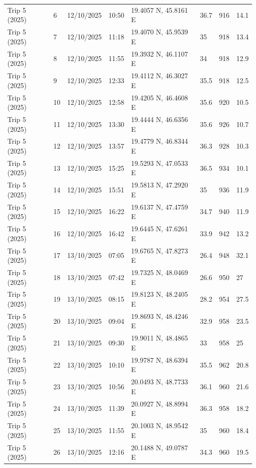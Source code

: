 \begin{scriptsize}
\begin{longtable}{llllllll}
Trip 5 (2025) & 6 & 12/10/2025 & 10:50 & 19.4057 N, 45.8161 E & 36.7 & 916 & 14.1 \\
Trip 5 (2025) & 7 & 12/10/2025 & 11:18 & 19.4070 N, 45.9539 E & 35 & 918 & 13.4 \\
Trip 5 (2025) & 8 & 12/10/2025 & 11:55 & 19.3932 N, 46.1107 E & 34 & 918 & 12.9 \\
Trip 5 (2025) & 9 & 12/10/2025 & 12:33 & 19.4112 N, 46.3027 E & 35.5 & 918 & 12.5 \\
Trip 5 (2025) & 10 & 12/10/2025 & 12:58 & 19.4205 N, 46.4608 E & 35.6 & 920 & 10.5 \\
Trip 5 (2025) & 11 & 12/10/2025 & 13:30 & 19.4444 N, 46.6356 E & 35.6 & 926 & 10.7 \\
Trip 5 (2025) & 12 & 12/10/2025 & 13:57 & 19.4779 N, 46.8344 E & 36.3 & 928 & 10.3 \\
Trip 5 (2025) & 13 & 12/10/2025 & 15:25 & 19.5293 N, 47.0533 E & 36.5 & 934 & 10.1 \\
Trip 5 (2025) & 14 & 12/10/2025 & 15:51 & 19.5813 N, 47.2920 E & 35 & 936 & 11.9 \\
Trip 5 (2025) & 15 & 12/10/2025 & 16:22 & 19.6137 N, 47.4759 E & 34.7 & 940 & 11.9 \\
Trip 5 (2025) & 16 & 12/10/2025 & 16:42 & 19.6445 N, 47.6261 E & 33.9 & 942 & 13.2 \\
Trip 5 (2025) & 17 & 13/10/2025 & 07:05 & 19.6765 N, 47.8273 E & 26.4 & 948 & 32.1 \\
Trip 5 (2025) & 18 & 13/10/2025 & 07:42 & 19.7325 N, 48.0469 E & 26.6 & 950 & 27 \\
Trip 5 (2025) & 19 & 13/10/2025 & 08:15 & 19.8123 N, 48.2405 E & 28.2 & 954 & 27.5 \\
Trip 5 (2025) & 20 & 13/10/2025 & 09:04 & 19.8693 N, 48.4246 E & 32.9 & 958 & 23.5 \\
Trip 5 (2025) & 21 & 13/10/2025 & 09:30 & 19.9011 N, 48.4865 E & 33 & 958 & 25 \\
Trip 5 (2025) & 22 & 13/10/2025 & 10:10 & 19.9787 N, 48.6394 E & 35.5 & 962 & 20.8 \\
Trip 5 (2025) & 23 & 13/10/2025 & 10:56 & 20.0493 N, 48.7733 E & 36.1 & 960 & 21.6 \\
Trip 5 (2025) & 24 & 13/10/2025 & 11:39 & 20.0927 N, 48.8994 E & 36.3 & 958 & 18.2 \\
Trip 5 (2025) & 25 & 13/10/2025 & 11:55 & 20.1003 N, 48.9542 E & 35 & 960 & 18.4 \\
Trip 5 (2025) & 26 & 13/10/2025 & 12:16 & 20.1488 N, 49.0787 E & 34.3 & 960 & 19.5 \\

\end{longtable}
\end{scriptsize}

